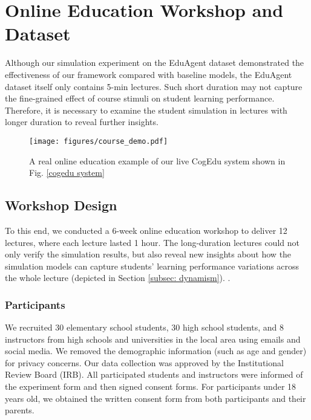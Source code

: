 \section{Online Education Workshop and Dataset}
\label{sec:workshop}

Although our simulation experiment on the EduAgent dataset demonstrated the effectiveness of our framework compared with baseline models, the EduAgent dataset itself only contains 5-min lectures. Such short duration may not capture the fine-grained effect of course stimuli on student learning performance.
Therefore, it is necessary to examine the student simulation in lectures with longer duration to reveal further insights. 


\begin{figure}%
\centering
\texttt{[image: figures/course\_demo.pdf]}
\caption{A real online education example of our live CogEdu system shown in Fig. \ref{cogedu system}}
\label{course system demo}
\end{figure}




\subsection{Workshop Design}

To this end, we conducted a 6-week online education workshop to deliver 12 lectures, where each lecture lasted 1 hour. The long-duration lectures could not only verify the simulation results, but also reveal new insights about how the simulation models can capture students' learning performance variations across the whole lecture (depicted in Section \ref{subsec: dynamism}). .

\subsubsection{\textbf{Participants}}

We recruited 30 elementary school students, 30 high school students, and 8 instructors from high schools and universities in the local area using emails and social media. 
We removed the demographic information (such as age and gender) for privacy concerns.
Our data collection was approved by the Institutional Review Board (IRB). All participated students and instructors were informed of the experiment form and then signed consent forms. For participants under 18 years old, we obtained the written consent form from both participants and their parents.







